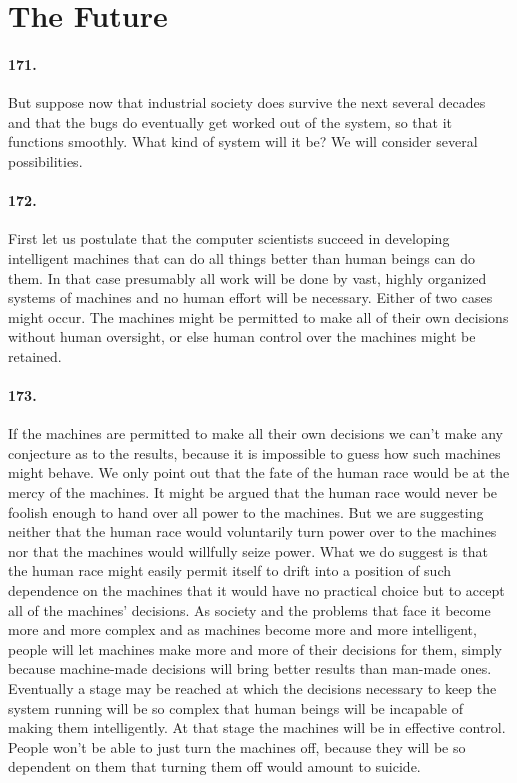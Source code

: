 \documentclass[12pt]{book}
\newcommand{\mysection}[1]{\section*{#1} \addcontentsline{toc}{section}{#1}}
\begin{document}
\mysection{The Future}


\paragraph{171.}  But suppose now that industrial society does survive the next several decades and that the bugs do eventually get worked out of the system, so that it functions smoothly. What kind of system will it be? We will consider several possibilities.


\paragraph{172.}  First let us postulate that the computer scientists succeed in developing intelligent machines that can do all things better than human beings can do them. In that case presumably all work will be done by vast, highly organized systems of machines and no human effort will be necessary.  Either of two cases might occur. The machines might be permitted to make all of their own decisions without human oversight, or else human control over the machines might be retained.


\paragraph{173.}  If the machines are permitted to make all their own decisions we can't make any conjecture as to the results, because it is impossible to guess how such machines might behave. We only point out that the fate of the human race would be at the mercy of the machines. It might be argued that the human race would never be foolish enough to hand over all power to the machines. But we are suggesting neither that the human race would voluntarily turn power over to the machines nor that the machines would willfully seize power. What we do suggest is that the human race might easily permit itself to drift into a position of such dependence on the machines that it would have no practical choice but to accept all of the machines' decisions. As society and the problems that face it become more and more complex and as machines become more and more intelligent, people will let machines make more and more of their decisions for them, simply because machine-made decisions will bring better results than man-made ones. Eventually a stage may be reached at which the decisions necessary to keep the system running will be so complex that human beings will be incapable of making them intelligently. At that stage the machines will be in effective control. People won't be able to just turn the machines off, because they will be so dependent on them that turning them off would amount to suicide.
\end{document}
